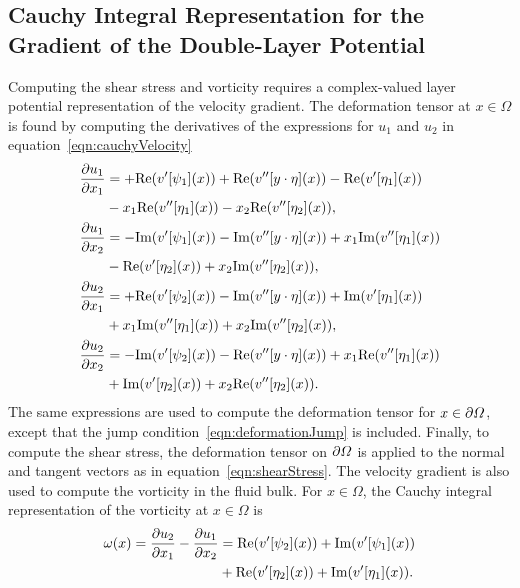 \documentclass{jfm}
\begin{document}
\subsection{Cauchy Integral Representation for the Gradient of the
Double-Layer Potential}
\label{sec:gradDLPcomplex}
Computing the shear stress and vorticity requires a complex-valued layer
potential representation of the velocity gradient.  The deformation
tensor at $x \in \Omega$ is found by computing the derivatives of the
expressions for $u_1$ and $u_2$ in equation~\eqref{eqn:cauchyVelocity}  
\begin{equation}
\label{eqn:cauchyGradient}
  \begin{aligned}
    \frac{\partial u_1}{\partial x_1} &= +\mbox{Re} (v'[\psi_1](x)) + 
    \mbox{Re} (v''[y\cdot\eta](x)) - \mbox{Re} (v'[\eta_1](x)) \\
    &- x_1\mbox{Re} (v''[\eta_1](x)) - x_2\mbox{Re} (v''[\eta_2](x)), \\
    \frac{\partial u_1}{\partial x_2} &= - \mbox{Im} (v'[\psi_1](x)) - 
    \mbox{Im} (v''[y\cdot\eta](x)) + x_1\mbox{Im} (v''[\eta_1](x)) \\
    &- \mbox{Re} (v'[\eta_2](x)) + x_2\mbox{Im} (v''[\eta_2](x)), \\
    \frac{\partial u_2}{\partial x_1} &= +\mbox{Re} (v'[\psi_2](x)) - 
    \mbox{Im} (v''[y\cdot\eta](x)) + \mbox{Im} (v'[\eta_1](x))  \\
    &+ x_1\mbox{Im} (v''[\eta_1](x)) + x_2\mbox{Im} (v''[\eta_2](x)), \\
    \frac{\partial u_2}{\partial x_2} &= -\mbox{Im} (v'[\psi_2](x)) - 
    \mbox{Re} (v''[y\cdot\eta](x)) + x_1\mbox{Re} (v''[\eta_1](x)) \\
    &+ \mbox{Im} (v'[\eta_2](x)) + x_2\mbox{Re} (v''[\eta_2](x)).
  \end{aligned}
\end{equation}
The same expressions are used to compute the deformation tensor for $x
\in {\partial}\varOmega$, except that the jump
condition~\eqref{eqn:deformationJump} is included.  Finally, to compute
the shear stress, the deformation tensor on ${\partial}\varOmega$ is applied to
the normal and tangent vectors as in equation~\eqref{eqn:shearStress}.
The velocity gradient is also used to compute the vorticity in the fluid
bulk.  For $x \in \Omega$, the Cauchy integral representation of the
vorticity at $x \in \Omega$ is
\begin{equation}
  \begin{aligned}
    \omega(x) = \frac{\partial u_2}{\partial x_1} - \frac{\partial u_1}{\partial x_2} &= 
      \mbox{Re} (v'[\psi_2](x)) + \mbox{Im} (v'[\psi_1](x))  \\
      &+ \mbox{Re} (v'[\eta_2](x))+ \mbox{Im} (v'[\eta_1](x)).
  \end{aligned}
\end{equation}
\end{document}
